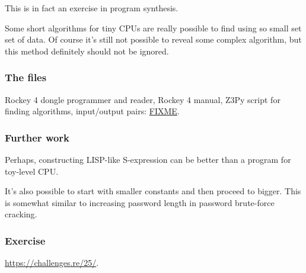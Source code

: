 This is in fact an exercise in program synthesis.

Some short algorithms for tiny \ac{CPU}s are really possible to find using so small set set of data.
Of course it's still not possible to reveal some complex algorithm,
but this method definitely should not be ignored.

\subsubsection{The files}

Rockey 4 dongle programmer and reader, Rockey 4 manual, Z3Py script for finding algorithms, input/output pairs:
\url{FIXME}.

\subsubsection{Further work}

Perhaps, constructing LISP-like S-expression can be better than a program for toy-level CPU.

It's also possible to start with smaller constants and then proceed to bigger.
This is somewhat similar to increasing password length in password brute-force cracking.

\subsubsection{Exercise}

\url{https://challenges.re/25/}.

